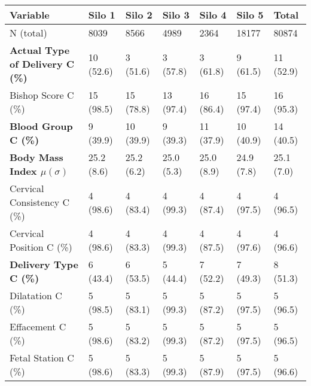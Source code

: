 
\begin{tabular}{LLLLLLL}
   \toprule
      Variable &               Silo 1 &               Silo 2 &               Silo 3 &               Silo 4 &               Silo 5 &                Total \\
   \midrule
   \hspace*{2mm} N (total) &              8039 &                 8566 &                 4989 &                 2364 &                18177 &                80874 \\
   
   \textbf{Actual Type of Delivery C (\%)}& 10 (52.6) & 3 (51.6) & 3 (57.8) & 3 (61.8) & 9 (61.5) & 11 (52.9) \\
   
   Bishop Score C (\%)&  15 (98.5) & 15 (78.8) & 13 (97.4) & 16 (86.4) & 15 (97.4) & 16 (95.3) \\
   
   \textbf{Blood Group C (\%)}& 9 (39.9) & 10 (39.9) & 9 (39.3) & 11 (37.9) & 10 (40.9) & 14 (40.5) \\
   
   \textbf{Body Mass Index $\mu (\sigma)$ } & 25.2 (8.6) & 25.2 (6.2) & 25.0 (5.3) & 25.0 (8.9) & 24.9 (7.8) & 25.1 (7.0) \\
   
   Cervical Consistency C (\%) & 4 (98.6) & 4 (83.4) & 4 (99.3) & 4 (87.4) & 4 (97.5) & 4 (96.5) \\
   
   Cervical Position C (\%)&  4 (98.6) & 4 (83.3) & 4 (99.3) & 4 (87.5) & 4 (97.6) & 4 (96.6) \\
   
   \textbf{Delivery Type C (\%)}& 6 (43.4) & 6 (53.5) & 5 (44.4) & 7 (52.2) & 7 (49.3) & 8 (51.3) \\
   
   Dilatation C (\%)&5 (98.5) & 5 (83.1) & 5 (99.3) & 5 (87.2) & 5 (97.5) & 5 (96.5) \\
   
   Effacement C (\%)& 5 (98.6) & 5 (83.2) & 5 (99.3) & 5 (87.2) & 5 (97.5) & 5 (96.5) \\
   
   Fetal Station  C (\%)&  5 (98.6) & 5 (83.3) & 5 (99.3) & 5 (87.9) & 5 (97.5) & 5 (96.6) \\
   

\end{tabular}
